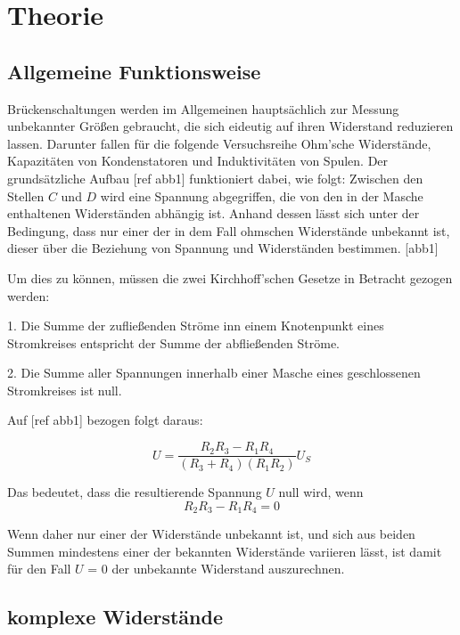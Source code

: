 \section{Theorie}
\label{sec:Theorie}

\subsection{Allgemeine Funktionsweise}

Brückenschaltungen werden im Allgemeinen hauptsächlich zur Messung unbekannter Größen 
gebraucht, die sich eideutig auf ihren Widerstand reduzieren lassen. Darunter fallen für
die folgende Versuchsreihe Ohm'sche Widerstände, Kapazitäten von Kondenstatoren und 
Induktivitäten von Spulen. Der grundsätzliche Aufbau [ref abb1] funktioniert dabei, wie folgt:
Zwischen den Stellen $C$ und $D$ wird eine Spannung abgegriffen, die von den in der Masche 
enthaltenen Widerständen abhängig ist. Anhand dessen lässt sich unter der Bedingung, dass 
nur einer der in dem Fall ohmschen Widerstände unbekannt ist, dieser über die Beziehung
von Spannung und Widerständen bestimmen. 
[abb1]

Um dies zu können, müssen die zwei Kirchhoff'schen Gesetze in Betracht gezogen werden:

1.  Die Summe der zufließenden Ströme inn einem Knotenpunkt eines Stromkreises entspricht
    der Summe der abfließenden Ströme.

2.  Die Summe aller Spannungen innerhalb einer Masche eines geschlossenen Stromkreises
    ist null.

Auf [ref abb1] bezogen folgt daraus:

\begin{equation}
    U = \frac{{R_2}{R_3}-{R_1}{R_4}}{({R_3}+{R_4})({R_1}{R_2})}U_S 
\end{equation}

Das bedeutet, dass die resultierende Spannung $U$ null wird, wenn 
\begin{equation}
    R_2 R_3 - R_1 R_4 = 0
\end{equation}

Wenn daher nur einer der Widerstände unbekannt ist, und sich aus beiden Summen mindestens einer
der bekannten Widerstände variieren lässt, ist damit für den Fall $U$ = 0 der unbekannte Widerstand
auszurechnen.

\subsection{komplexe Widerstände}

